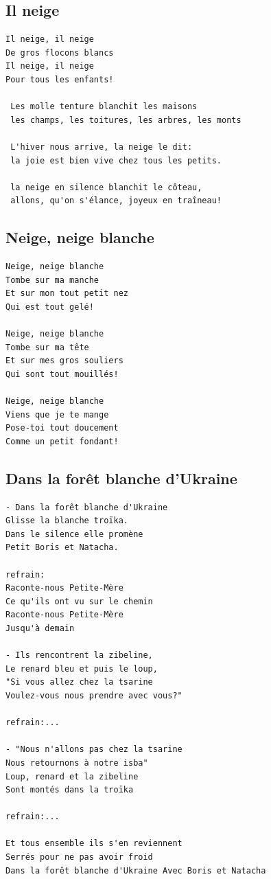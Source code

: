 \documentclass[
]{article}
\begin{document}
\hypertarget{il-neige}{%
\subsection*{Il neige}\label{il-neige}}

\begin{verbatim}
Il neige, il neige
De gros flocons blancs
Il neige, il neige
Pour tous les enfants!

 Les molle tenture blanchit les maisons
 les champs, les toitures, les arbres, les monts

 L'hiver nous arrive, la neige le dit:
 la joie est bien vive chez tous les petits.

 la neige en silence blanchit le côteau,
 allons, qu'on s'élance, joyeux en traîneau!
\end{verbatim}

\hypertarget{neige-neige-blanche}{%
\subsection*{Neige, neige blanche}\label{neige-neige-blanche}}

\begin{verbatim}
Neige, neige blanche
Tombe sur ma manche
Et sur mon tout petit nez
Qui est tout gelé!

Neige, neige blanche
Tombe sur ma tête
Et sur mes gros souliers
Qui sont tout mouillés!

Neige, neige blanche
Viens que je te mange
Pose-toi tout doucement
Comme un petit fondant!
\end{verbatim}

\hypertarget{dans-la-foruxeat-blanche-dukraine}{%
\subsection*{Dans la forêt blanche
d'Ukraine}\label{dans-la-foruxeat-blanche-dukraine}}

\begin{verbatim}
- Dans la forêt blanche d'Ukraine
Glisse la blanche troïka.
Dans le silence elle promène
Petit Boris et Natacha.

refrain:
Raconte-nous Petite-Mère
Ce qu'ils ont vu sur le chemin
Raconte-nous Petite-Mère
Jusqu'à demain

- Ils rencontrent la zibeline,
Le renard bleu et puis le loup,
"Si vous allez chez la tsarine
Voulez-vous nous prendre avec vous?"

refrain:...

- "Nous n'allons pas chez la tsarine
Nous retournons à notre isba"
Loup, renard et la zibeline
Sont montés dans la troïka

refrain:...

Et tous ensemble ils s'en reviennent
Serrés pour ne pas avoir froid
Dans la forêt blanche d'Ukraine Avec Boris et Natacha
\end{verbatim}
\end{document}
